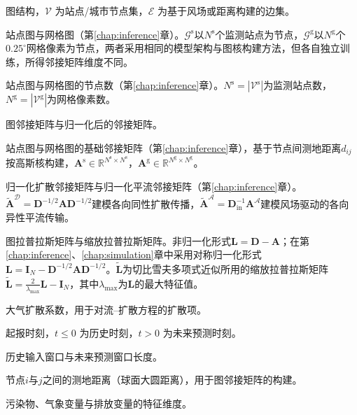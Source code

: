 \begin{denotation}[3cm]
\item[\(\mathcal{G} = (\mathcal{V}, \mathcal{E})\)] 图结构，\(\mathcal{V}\) 为站点/城市节点集，\(\mathcal{E}\) 为基于风场或距离构建的边集。
\item[\(\mathcal{G}^{\text{s}}, \mathcal{G}^{\text{g}}\)] 站点图与网格图（第\ref{chap:inference}章）。$\mathcal{G}^{\text{s}}$以$N^{\text{s}}$个监测站点为节点，$\mathcal{G}^{\text{g}}$以$N^{\text{g}}$个$0.25^{\circ}$网格像素为节点，两者采用相同的模型架构与图核构建方法，但各自独立训练，所得邻接矩阵维度不同。
\item[\(N^{\text{s}}, N^{\text{g}}\)] 站点图与网格图的节点数（第\ref{chap:inference}章）。$N^{\text{s}} = |\mathcal{V}^{\text{s}}|$为监测站点数，$N^{\text{g}} = |\mathcal{V}^{\text{g}}|$为网格像素数。
\item[\(\mathbf{A}, \tilde{\mathbf{A}}\)] 图邻接矩阵与归一化后的邻接矩阵。
\item[\(\mathbf{A}^{\text{s}}, \mathbf{A}^{\text{g}}\)] 站点图与网格图的基础邻接矩阵（第\ref{chap:inference}章），基于节点间测地距离$d_{ij}$按高斯核构建，$\mathbf{A}^{\text{s}} \in \mathbb{R}^{N^{\text{s}} \times N^{\text{s}}}$，$\mathbf{A}^{\text{g}} \in \mathbb{R}^{N^{\text{g}} \times N^{\text{g}}}$。
\item[\(\tilde{\mathbf{A}}^{\mathcal{D}}, \tilde{\mathbf{A}}^{\mathcal{A}}\)] 归一化扩散邻接矩阵与归一化平流邻接矩阵（第\ref{chap:inference}章）。$\tilde{\mathbf{A}}^{\mathcal{D}} = \mathbf{D}^{-1/2}\mathbf{A}\mathbf{D}^{-1/2}$建模各向同性扩散传播，$\tilde{\mathbf{A}}^{\mathcal{A}} = \mathbf{D}_{\text{in}}^{-1}\mathbf{A}^{\mathcal{A}}$建模风场驱动的各向异性平流传输。
\item[\(\mathbf{L}, \tilde{\mathbf{L}}\)] 图拉普拉斯矩阵与缩放拉普拉斯矩阵。非归一化形式$\mathbf{L} = \mathbf{D} - \mathbf{A}$；在第\ref{chap:inference}、\ref{chap:simulation}章中采用对称归一化形式$\mathbf{L} = \mathbf{I}_N - \mathbf{D}^{-1/2}\mathbf{A}\mathbf{D}^{-1/2}$。$\tilde{\mathbf{L}}$为切比雪夫多项式近似所用的缩放拉普拉斯矩阵$\tilde{\mathbf{L}} = \frac{2}{\lambda_{\max}}\mathbf{L} - \mathbf{I}_N$，其中$\lambda_{\max}$为$\mathbf{L}$的最大特征值。
\item[\(K\)] 大气扩散系数，用于对流--扩散方程的扩散项。
\item[\(t=0\)] 起报时刻，\(t \leq 0\) 为历史时刻，\(t>0\) 为未来预测时刻。
\item[\(T', T\)] 历史输入窗口与未来预测窗口长度。
\item[\(d_{ij}\)] 节点$i$与$j$之间的测地距离（球面大圆距离），用于图邻接矩阵的构建。
\item[\(D_X, D_M, D_E\)] 污染物、气象变量与排放变量的特征维度。


\end{denotation}
